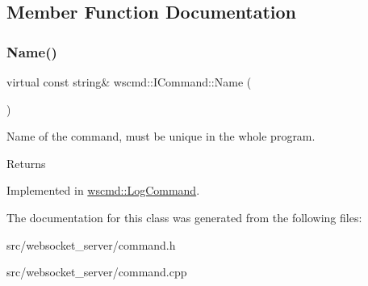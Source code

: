 \subsection{Member Function Documentation}
\mbox{\label{classwscmd_1_1ICommand_a1a9fdc32265fa902cb5f3ab153386a9e}} 
\subsubsection{\texorpdfstring{Name()}{Name()}}
{\footnotesize\ttfamily virtual const string\& wscmd\+::\+I\+Command\+::\+Name (\begin{DoxyParamCaption}{ }\end{DoxyParamCaption})\hspace{0.3cm}{\ttfamily [pure virtual]}}



Name of the command, must be unique in the whole program. 

\begin{DoxyReturn}{Returns}

\end{DoxyReturn}


Implemented in \hyperlink{classwscmd_1_1LogCommand_a465f14b51110d3f0a7d5fe873bafd857}{wscmd\+::\+Log\+Command}.



The documentation for this class was generated from the following files\+:\begin{DoxyCompactItemize}
\item 
src/websocket\+\_\+server/command.\+h\item 
src/websocket\+\_\+server/command.\+cpp\end{DoxyCompactItemize}

